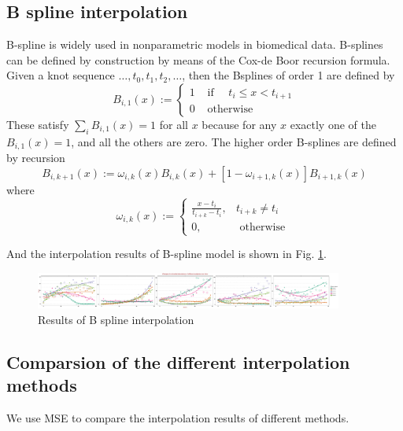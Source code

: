 \documentclass{article}
\begin{document}
\subsection{B spline interpolation}

B-spline is widely used in nonparametric models in biomedical data. B-splines can be defined by construction by means of the Cox-de Boor recursion formula. Given a knot sequence $\ldots, t_{0}, t_{1}, t_{2}, \ldots$, then the Bsplines of order 1 are defined by 
\begin{equation}
    \label{dggh}
    B_{i, 1}(x):= \begin{cases}1 & \text { if } \quad t_{i} \leq x<t_{i+1} \\ 0 & \text { otherwise }\end{cases}
    \end{equation}
These satisfy $\sum_{i} B_{i, 1}(x)=1$ for all $x$ because for any $x$ exactly one of the $B_{i, 1}(x)=1$, and all the others are zero.
The higher order B-splines are defined by recursion
\begin{equation}
    B_{i, k+1}(x):=\omega_{i, k}(x) B_{i, k}(x)+\left[1-\omega_{i+1, k}(x)\right] B_{i+1, k}(x)
\end{equation}
where
\begin{equation}
\omega_{i, k}(x):= \begin{cases}\frac{x-t_{i}}{t_{i+k}-t_{i}}, & t_{i+k} \neq t_{i} \\ 0, & \text { otherwise }\end{cases}
\end{equation}

And the interpolation results of B-spline model is shown in Fig. \ref{bs}.

\begin{figure}[h]
    \centering
    \includegraphics[width=0.9\textwidth]{figure/B_spline.pdf}
    \caption{Results of B spline interpolation}\label{bs}
\end{figure}


\subsection{Comparsion of the different interpolation methods}

We use MSE to compare the interpolation results of different methods.
\end{document}
